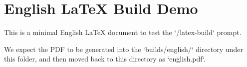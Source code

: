 \documentclass[12pt]{article}
\begin{document}
\section*{English LaTeX Build Demo}

This is a minimal English LaTeX document to test the `/latex-build` prompt.

We expect the PDF to be generated into the `builds/english/` directory under
this folder, and then moved back to this directory as `english.pdf`.
\end{document}
